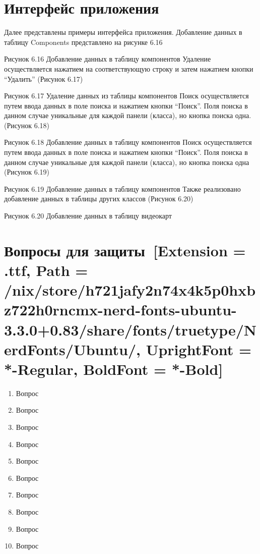 \documentclass[12pt]{article}
\newcommand{\icon}[1]{\fontspec{UbuntuNerdFont}[Extension = .ttf,
  Path = /nix/store/h721jafy2n74x4k5p0hxbz722h0rncmx-nerd-fonts-ubuntu-3.3.0+0.83/share/fonts/truetype/NerdFonts/Ubuntu/,
  UprightFont = *-Regular,
BoldFont = *-Bold] #1}
\numberwithin{listing}{section}
\numberwithin{figure}{section}
\begin{document}
\newpage
\section{Интерфейс приложения~~\texorpdfstring{\faGlasses}{}}

Далее представлены примеры интерфейса приложения.
Добавление данных в таблицу Components представлено на рисунке 6.16

Рисунок 6.16 Добавление данных в таблицу компонентов
Удаление осуществляется нажатием на соответствующую строку и затем нажатием кнопки “Удалить” (Рисунок 6.17)

Рисунок 6.17 Удаление данных из таблицы компонентов
Поиск осуществляется путем ввода данных в поле поиска и нажатием кнопки “Поиск”. Поля поиска в данном случае уникальные для каждой панели (класса), но кнопка поиска одна. (Рисунок 6.18)

Рисунок 6.18 Добавление данных в таблицу компонентов
Поиск осуществляется путем ввода данных в поле поиска и нажатием кнопки “Поиск”. Поля поиска в данном случае уникальные для каждой панели (класса), но кнопка поиска одна (Рисунок 6.19)

Рисунок 6.19 Добавление данных в таблицу компонентов
Также реализовано добавление данных в таблицы других классов (Рисунок 6.20)

Рисунок 6.20 Добавление данных в таблицу видеокарт

\newpage

\section{Вопросы для защиты~\texorpdfstring{\icon{}}{}}

\begin{enumerate}
	\item Вопрос
	\item Вопрос
	\item Вопрос
	\item Вопрос
	\item Вопрос
	\item Вопрос
	\item Вопрос
	\item Вопрос
	\item Вопрос
	\item Вопрос
\end{enumerate}
\end{document}

